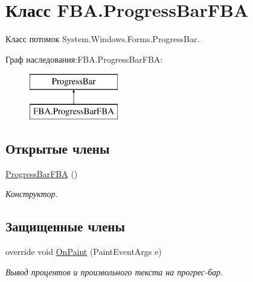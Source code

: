 \hypertarget{class_f_b_a_1_1_progress_bar_f_b_a}{}\section{Класс F\+B\+A.\+Progress\+Bar\+F\+BA}
\label{class_f_b_a_1_1_progress_bar_f_b_a}


Класс потомок System.\+Windows.\+Forms.\+Progress\+Bar.  


Граф наследования\+:F\+B\+A.\+Progress\+Bar\+F\+BA\+:\begin{figure}[H]
\begin{center}
\leavevmode
\includegraphics[height=2.000000cm]{class_f_b_a_1_1_progress_bar_f_b_a}
\end{center}
\end{figure}
\subsection*{Открытые члены}
\begin{DoxyCompactItemize}
\item 
\mbox{\hyperlink{class_f_b_a_1_1_progress_bar_f_b_a_a1a6672354812babb4c27f75f15ed19db}{Progress\+Bar\+F\+BA}} ()
\begin{DoxyCompactList}\small\item\em Конструктор. \end{DoxyCompactList}\end{DoxyCompactItemize}
\subsection*{Защищенные члены}
\begin{DoxyCompactItemize}
\item 
override void \mbox{\hyperlink{class_f_b_a_1_1_progress_bar_f_b_a_a72b5357e9b32de28f4d895495fc0994d}{On\+Paint}} (Paint\+Event\+Args e)
\begin{DoxyCompactList}\small\item\em Вывод процентов и произвольного текста на прогрес-\/бар. \end{DoxyCompactList}\end{DoxyCompactItemize}
